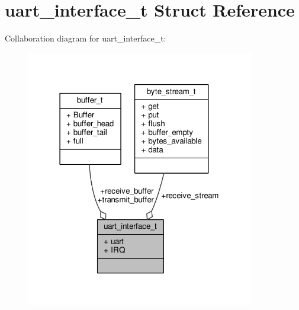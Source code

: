 \hypertarget{structuart__interface__t}{\section{uart\+\_\+interface\+\_\+t Struct Reference}
\label{structuart__interface__t}
}


Collaboration diagram for uart\+\_\+interface\+\_\+t\+:
\nopagebreak
\begin{figure}[H]
\begin{center}
\leavevmode
\includegraphics[width=282pt]{structuart__interface__t__coll__graph}
\end{center}
\end{figure}
